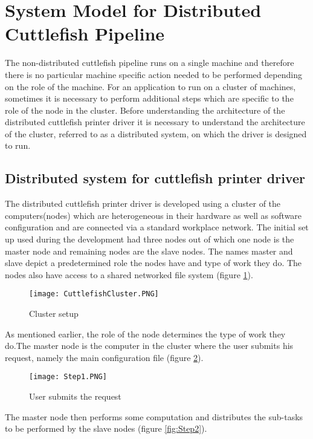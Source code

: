 \section{System Model for Distributed Cuttlefish Pipeline} \label{sysMod}

The non-distributed cuttlefish pipeline runs on a single machine and therefore there is no particular machine specific action needed to be performed depending on the role of the machine. For an application to run on a cluster of machines, sometimes it is necessary to perform additional steps which are specific to the role of the node in the cluster. Before understanding the architecture of the distributed cuttlefish printer driver it is necessary to understand the architecture of the cluster, referred to as a distributed system, on which the driver is designed to run. 

\subsection{Distributed system for cuttlefish printer driver} \label{clusterArch}

The distributed cuttlefish printer driver is developed using a cluster of the computers(nodes) which are heterogeneous in their hardware as well as software configuration and are connected via a standard workplace network. The initial set up used during the development had three nodes out of which one node is the master node and remaining nodes are the slave nodes. The names master and slave depict a predetermined role the nodes have and type of work they do. The nodes also have access to a shared networked file system (figure \ref{fig:CuttlefishCluster}).

\begin{figure}[ht!]
\centering
\texttt{[image: CuttlefishCluster.PNG]}
\caption{Cluster setup}
\label{fig:CuttlefishCluster}
\end{figure}

As mentioned earlier, the role of the node determines the type of work they do.The master node is the computer in the cluster where the user submits his request, namely the main configuration file (figure \ref{fig:Step1}). 

\begin{figure}[ht!]
\centering
\texttt{[image: Step1.PNG]}
\caption{User submits the request}
\label{fig:Step1}
\end{figure}

The master node then performs some computation and distributes the sub-tasks to be performed by the slave nodes (figure \ref{fig:Step2}). 

